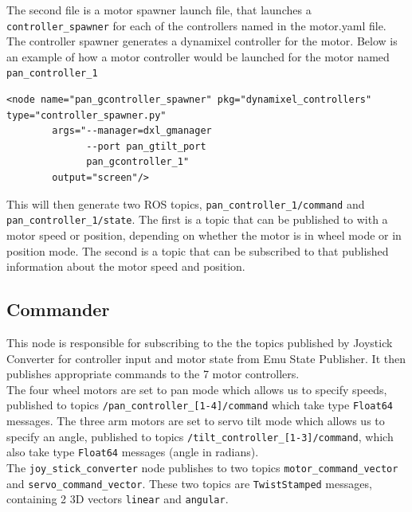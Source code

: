 \documentclass[titlepage,12pt,a4paper]{article}
\begin{document}
\noindent The second file is a motor spawner launch file, that launches a \texttt{controller\_spawner} for each of the controllers named in the motor.yaml file. The controller spawner generates a dynamixel controller for the motor. Below is an example of how a motor controller would be launched for the motor named \texttt{pan\_controller\_1}\\

\begin{lstlisting}
<node name="pan_gcontroller_spawner" pkg="dynamixel_controllers" type="controller_spawner.py"
        args="--manager=dxl_gmanager
              --port pan_gtilt_port
              pan_gcontroller_1"
        output="screen"/>
\end{lstlisting}


\noindent This will then generate two ROS topics, \texttt{pan\_controller\_1/command} and\\ \noindent\texttt{pan\_controller\_1/state}. The first is a topic that can be published to with a motor speed or position, depending on whether the motor is in wheel mode or in position mode. The second is a topic that can be subscribed to that published information about the motor speed and position.

\newpage
\subsection{Commander}
This node is responsible for subscribing to the the topics published by Joystick Converter for controller input and motor state from Emu State Publisher. It then publishes appropriate commands to the 7 motor controllers.\\

\noindent The four wheel motors are set to pan mode which allows us to specify speeds, published to topics \texttt{/pan\_controller\_[1-4]/command} which take type \texttt{Float64} messages. The three arm motors are set to servo tilt mode which allows us to specify an angle, published to topics \texttt{/tilt\_controller\_[1-3]/command}, which also take type \texttt{Float64} messages (angle in radians).\\

\noindent The \texttt{joy\_stick\_converter} node publishes to two topics \texttt{motor\_command\_vector} and \texttt{servo\_command\_vector}. These two topics are \texttt{TwistStamped} messages, containing 2 3D vectors \texttt{linear} and \texttt{angular}.\\
\end{document}
